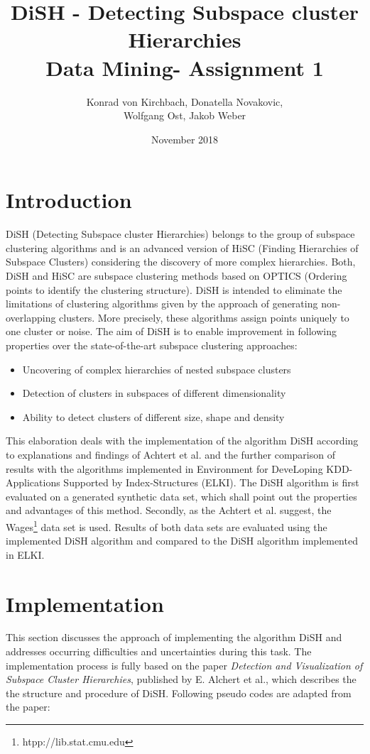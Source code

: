 \documentclass{article}
\title{DiSH - Detecting Subspace cluster Hierarchies \\ Data Mining- Assignment 1}
\author{Konrad von Kirchbach, Donatella Novakovic, \\ Wolfgang Ost, Jakob Weber}
\date{November 2018}
\begin{document}
\maketitle

\section{Introduction}
DiSH (Detecting Subspace cluster Hierarchies) belongs to the group of subspace clustering algorithms and is an advanced version of HiSC (Finding Hierarchies of Subspace Clusters) considering the discovery of more complex hierarchies. Both, DiSH and HiSC are subspace clustering methods based on OPTICS (Ordering points to identify the clustering structure). DiSH is intended to eliminate the limitations of clustering algorithms given by the approach of generating non-overlapping clusters. More precisely, these algorithms assign points uniquely to one cluster or noise. The aim of DiSH is to enable improvement in following properties over the state-of-the-art subspace clustering approaches: 
\begin{itemize}
    \item Uncovering of complex hierarchies of nested subspace clusters
    \item Detection of clusters in subspaces of different dimensionality
    \item Ability to detect clusters of different size, shape and density
\end{itemize}

This elaboration deals with the implementation of the algorithm DiSH according to explanations and findings of Achtert et al. and the further comparison of results with the algorithms implemented in Environment for DeveLoping KDD-Applications Supported by Index-Structures (ELKI). The DiSH algorithm is first evaluated on a generated synthetic data set, which shall point out the properties and advantages of this method. Secondly, as the Achtert et al. suggest, the Wages\footnote{htpp://lib.stat.cmu.edu} data set is used. Results of both data sets are evaluated using the implemented DiSH algorithm and compared to the DiSH algorithm implemented in ELKI.    

\section{Implementation}
This section discusses the approach of implementing the algorithm DiSH and addresses occurring difficulties and uncertainties during this task. The implementation process is fully based on the paper \emph{Detection and Visualization of Subspace Cluster Hierarchies}, published by E. Alchert et al., which describes the the structure and procedure of DiSH. Following pseudo codes are adapted from the paper:\par
\end{document}
